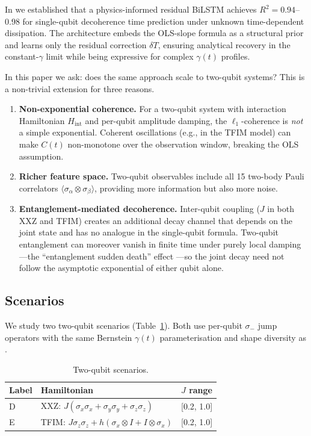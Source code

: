 \documentclass[twocolumn,10pt]{article}
\begin{document}
In \cite{Paper1Brusnikin} we established that a physics-informed residual
BiLSTM achieves $R^2 = 0.94$--$0.98$ for single-qubit decoherence time
prediction under unknown time-dependent dissipation.
The architecture embeds the OLS-slope formula as a structural prior and
learns only the residual correction $\delta T$, ensuring analytical
recovery in the constant-$\gamma$ limit while being expressive for
complex $\gamma(t)$ profiles.

In this paper we ask: does the same approach scale to two-qubit systems?
This is a non-trivial extension for three reasons.

\begin{enumerate}
  \item \textbf{Non-exponential coherence.}
    For a two-qubit system with interaction Hamiltonian $H_\mathrm{int}$
    and per-qubit amplitude damping, the $\ell_1$-coherence is
    \emph{not} a simple exponential.
    Coherent oscillations (e.g., in the TFIM model) can make $C(t)$
    non-monotone over the observation window, breaking the OLS assumption.
  \item \textbf{Richer feature space.}
    Two-qubit observables include all 15 two-body Pauli correlators
    $\langle\sigma_\alpha \otimes \sigma_\beta\rangle$, providing more
    information but also more noise.
  \item \textbf{Entanglement-mediated decoherence.}
    Inter-qubit coupling ($J$ in both XXZ and TFIM) creates an
    additional decay channel that depends on the joint state and has no
    analogue in the single-qubit formula.
    Two-qubit entanglement can moreover vanish in finite time under
    purely local damping---the ``entanglement sudden death'' effect
    \cite{YuEberly2009}---so the joint decay need not follow the
    asymptotic exponential of either qubit alone.
\end{enumerate}

\subsection*{Scenarios}

We study two two-qubit scenarios (Table~\ref{tab:scenarios2}).
Both use per-qubit $\sigma_-$ jump operators with the same Bernstein
$\gamma(t)$ parameterisation and shape diversity as \cite{Paper1Brusnikin}.

\begin{table}[h]
\centering
\caption{Two-qubit scenarios.\label{tab:scenarios2}}
\small
\begin{tabular}{lll}
\toprule
Label & Hamiltonian & $J$ range \\
\midrule
D & XXZ: $J(\sigma_x\sigma_x + \sigma_y\sigma_y + \sigma_z\sigma_z)$ & [0.2, 1.0] \\
E & TFIM: $J\sigma_z\sigma_z + h(\sigma_x \otimes I + I \otimes \sigma_x)$ & [0.2, 1.0] \\
\bottomrule
\end{tabular}
\end{table}
\end{document}
